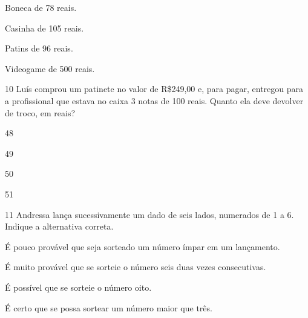 \begin{minipage}{.5\textwidth}
\begin{escolha}
\item Boneca de 78 reais.

\item Casinha de 105 reais.

\item Patins de 96 reais.

\item Videogame de 500 reais.
\end{escolha}
\end{minipage}

\num{10} Luís comprou um patinete no valor de R\$249,00 e, para pagar, entregou
para a profissional que estava no caixa 3 notas de 100 reais. Quanto ela deve devolver de troco, em reais?

\begin{minipage}{.5\textwidth}
\begin{escolha}
\item 48

\item 49

\item 50

\item 51
\end{escolha}
\end{minipage}

\num{11} Andressa lança sucessivamente um dado de seis lados, numerados de 1 a 6.
Indique a alternativa correta.

\begin{escolha}
\item É pouco provável que seja sorteado um número ímpar em um lançamento.

\item É muito provável que se sorteie o número seis duas vezes consecutivas.

\item É possível que se sorteie o número oito.

\item É certo que se possa sortear um número maior que três.
\end{escolha}

